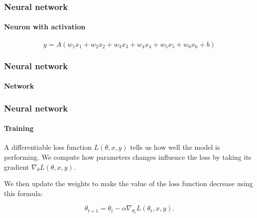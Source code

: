 \documentclass[10pt]{beamer}
\begin{document}
\begin{frame}
  \frametitle{Neural network}

  \framesubtitle{Neuron with activation}

  \begin{center}
    \scalebox{0.6}{
      
    }
  \end{center}

  \begin{center}
  \end{center}

  \vspace{-0.5cm}

  \[
  y = A(w_{1}x_{1} + w_{2}x_{2} + w_{3}x_{3} + w_{4}x_{4} + w_{5}x_{5} + w_{6}x_{6} + b)
  \]
\end{frame}

\begin{frame}
  \frametitle{Neural network}

  \framesubtitle{Network}

  \begin{center}
    \scalebox{0.7}{
      
    }
  \end{center}
\end{frame}

\begin{frame}
  \frametitle{Neural network}

  \framesubtitle{Training}

  \begin{center}
    \scalebox{0.5}{
      
    }
  \end{center}

  \smallskip

  A differentiable loss function $L(\theta, x, y)$ tells us how well
  the model is performing. We compute how parameters changes influence
  the loss by taking its gradient $\nabla_{\theta} L(\theta, x, y)$.

  \medskip

  We then update the weights to make the value of the loss function
  decrease using this formula:

  \[
  \theta_{t + 1} = \theta_{t} - \alpha \nabla_{\theta_{t}} L(\theta_{t}, x, y).
  \]
\end{frame}
\end{document}
